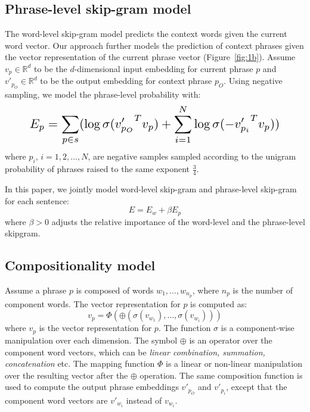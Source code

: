 \subsection{Phrase-level skip-gram model}
The word-level skip-gram model predicts the context words given the current word vector. Our approach further models the prediction of
context phrases given the vector representation of the current phrase vector (Figure~\ref{fig:1b}). Assume $v_p \in {\mathbb{R}}^d$ to be the $d$-dimensional 
input embedding for current phrase $p$ and $v'_{p_O}\in {\mathbb{R}}^d$ to be the output embedding for context phrase $p_O$. Using negative sampling, we model the phrase-level probability with:
\begin{equation}
\label{eq:phrase-skip}
\resizebox{.87\hsize}{!}{$\displaystyle
    E_p = \sum_{p\in s} (\log \sigma ({v'_{p_O}}^T v_p) + \sum_{i=1}^{N} \log \sigma (-{v'_{p_i}}^T v_p))
$}
\end{equation}
where $p_i$, $i= 1, 2, \ldots ,N$, are negative samples sampled according to the unigram probability of phrases raised to the same exponent $\frac{3}{4}$.


In this paper, we jointly model word-level skip-gram and phrase-level skip-gram for each sentence:
\begin{equation}
E = E_w + \beta E_p
\end{equation}
where $\beta > 0$ adjusts the relative importance of the word-level and the phrase-level skipgram.
\subsection{Compositionality model}
Assume a phrase $p$ is composed of words $w_1, \ldots ,w_{n_p}$, where 
$n_p$ is the number of component words. The vector representation for $p$ is computed as:
\begin{equation}
    v_p = \Phi(\oplus( \sigma(v_{w_1}), \ldots ,\sigma(v_{w_i})))
\end{equation}
where $v_p$ is the vector representation for $p$. The function $\sigma$ is a component-wise manipulation over each dimension.
The symbol $\oplus$ is an operator over the component word vectors, which can be \textit{linear combination, summation, concatenation} etc. 
The mapping function $\Phi$ is a linear or non-linear manipulation over the resulting vector after the $\oplus$ operation. The same composition function is used to compute 
the output phrase embeddings $v'_{p_O}$ and $v'_{p_i}$, except that the component word vectors are $v'_{w_i}$ instead of $v_{w_i}$.


